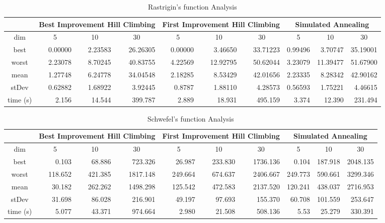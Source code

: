 \documentclass[a4paper]{article}
\begin{document}
\begin{table}[h]
	\centering
	\caption{Rastrigin's function Analysis}
	\begin{tabular}{|c|r|r|r|r|r|r|r|r|r|}
		\toprule
		& \multicolumn{3}{c|}{Best Improvement Hill Climbing} & \multicolumn{3}{c|}{First Improvement Hill Climbing} & \multicolumn{3}{c|}{Simulated Annealing} \\
		\midrule
		dim   & \multicolumn{1}{c|}{5} & \multicolumn{1}{c|}{10} & \multicolumn{1}{c|}{30} & \multicolumn{1}{c|}{5} & \multicolumn{1}{c|}{10} & \multicolumn{1}{c|}{30} & \multicolumn{1}{c|}{5} & \multicolumn{1}{c|}{10} & \multicolumn{1}{c|}{30} \\
		\midrule
		best  & 0.00000 & 2.23583 & 26.26305 & 0.00000 & 3.46650 & 33.71223 & 0.99496 & 3.70747 & 35.19001 \\
		\midrule
		worst & 2.23078 & 8.70245 & 40.83755 & 4.22569 & 12.92795 & 50.62044 & 3.23079 & 11.39477 & 51.67900 \\
		\midrule
		mean & 1.27748 & 6.24778 & 34.04548 & 2.18285 & 8.53429 & 42.01656 & 2.23335 & 8.28342 & 42.90162 \\
		\midrule
		stDev & 0.62882 & 1.68922 & 3.92445 & 0.8787 & 1.88110 & 4.28573 & 0.56593 & 1.75221 & 4.46615 \\
		\midrule
		time (s) & 2.156 & 14.544 & 399.787 & 2.889 & 18.931 & 495.159 & 3.374 & 12.390 & 231.494 \\
		\bottomrule
	\end{tabular}%
	\label{tab:addlabel}%
\end{table}%

\begin{table}[H]
	\centering
	\caption{Schwefel's function Analysis}
	\begin{tabular}{|c|r|r|r|r|r|r|r|r|r|}
		\toprule
		& \multicolumn{3}{c|}{Best Improvement Hill Climbing} & \multicolumn{3}{c|}{First Improvement Hill Climbing} & \multicolumn{3}{c|}{Simulated Annealing} \\
		\midrule
		dim   & \multicolumn{1}{c|}{5} & \multicolumn{1}{c|}{10} & \multicolumn{1}{c|}{30} & \multicolumn{1}{c|}{5} & \multicolumn{1}{c|}{10} & \multicolumn{1}{c|}{30} & \multicolumn{1}{c|}{5} & \multicolumn{1}{c|}{10} & \multicolumn{1}{c|}{30} \\
		\midrule
		best  & 0.103 & 68.886 & 723.326 & 26.987 & 233.830 & 1736.136 & 0.104 & 187.918 & 2048.135 \\
		\midrule
		worst & 118.652 & 421.385 & 1817.148 & 249.664 & 674.637 & 2406.667  & 249.773 & 590.661 & 3299.346 \\
		\midrule
		mean & 30.182 & 262.262 & 1498.298 & 125.542 & 472.583 & 2137.520 & 120.241 & 438.037 & 2716.953 \\
		\midrule
		stDev & 31.698 & 86.028 & 216.901  & 49.197 & 97.693 & 155.370 & 60.708 & 101.559 & 253.647 \\
		\midrule
		time (s) & 5.077 & 43.371 & 974.664 & 2.980 & 21.508 & 508.136 & 5.53 & 25.279 & 330.391 \\
		\bottomrule
	\end{tabular}%
	\label{tab:addlabel}%
\end{table}%
\end{document}
